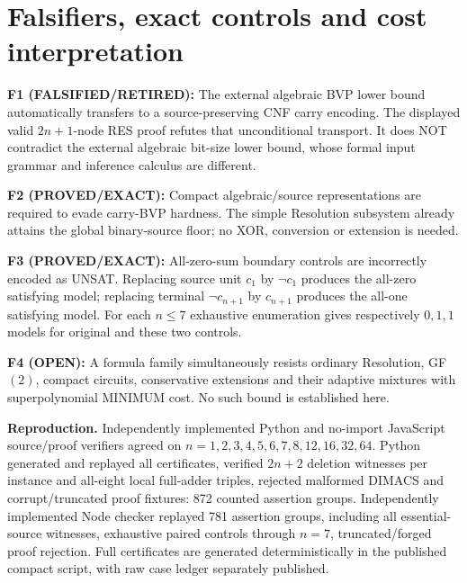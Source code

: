 \documentclass[11pt]{article}
\begin{document}
\section*{Falsifiers, exact controls and cost interpretation}
\noindent\textbf{F1 (FALSIFIED/RETIRED):} The external algebraic BVP lower bound automatically transfers to a source-preserving CNF carry encoding. The displayed valid $2n+1$-node RES proof refutes that unconditional transport. It does NOT contradict the external algebraic bit-size lower bound, whose formal input grammar and inference calculus are different.

\par\noindent\textbf{F2 (PROVED/EXACT):} Compact algebraic/source representations are required to evade carry-BVP hardness. The simple Resolution subsystem already attains the global binary-source floor; no XOR, conversion or extension is needed.

\par\noindent\textbf{F3 (PROVED/EXACT):} All-zero-sum boundary controls are incorrectly encoded as UNSAT. Replacing source unit $c_1$ by $\neg c_1$ produces the all-zero satisfying model; replacing terminal $\neg c_{n+1}$ by $c_{n+1}$ produces the all-one satisfying model. For each $n\le7$ exhaustive enumeration gives respectively $0,1,1$ models for original and these two controls.

\par\noindent\textbf{F4 (OPEN):} A formula family simultaneously resists ordinary Resolution, GF$(2)$, compact circuits, conservative extensions and their adaptive mixtures with superpolynomial MINIMUM cost. No such bound is established here.

\par\noindent\textbf{Reproduction.} Independently implemented Python and no-import JavaScript source/proof verifiers agreed on $n=1,2,3,4,5,6,7,8,12,16,32,64$. Python generated and replayed all certificates, verified $2n+2$ deletion witnesses per instance and all-eight local full-adder triples, rejected malformed DIMACS and corrupt/truncated proof fixtures: 872 counted assertion groups. Independently implemented Node checker replayed 781 assertion groups, including all essential-source witnesses, exhaustive paired controls through $n=7$, truncated/forged proof rejection. Full certificates are generated deterministically in the published compact script, with raw case ledger separately published.
\end{document}

